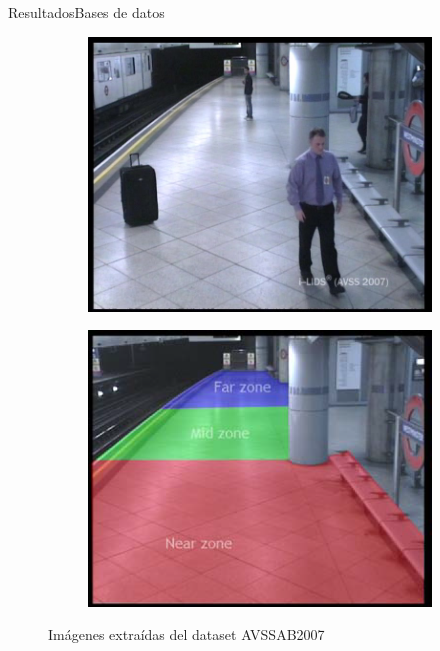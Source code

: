 \begin{frame}{Resultados}{Bases de datos}
\begin{figure}[ht]
  \centering
  \begin{subfigure}[b]{0.28\textwidth}
    \includegraphics[width=\textwidth]{Images/resultados/datasets/AVSSAB_1.jpg}
    \caption{}
    \label{fig:AVSSAB_1}
  \end{subfigure}
  \qquad
  \begin{subfigure}[b]{0.28\textwidth}
    \includegraphics[width=\textwidth]{Images/resultados/datasets/avssab2007-zones.png}
    \caption{}
    \label{fig:AVSSAB_2}
  \end{subfigure}
  \caption{Imágenes extraídas del dataset AVSSAB2007}
  \label{fig:AVSSAB2007}
\end{figure}
    
\end{frame}

